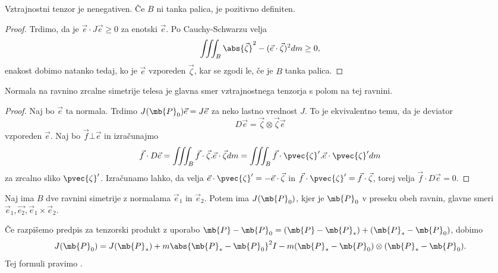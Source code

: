 \begin{trditev}
  Vztrajnostni tenzor je nenegativen.
  Če $B$ ni tanka palica, je pozitivno definiten.
\end{trditev}

\begin{proof}
  Trdimo, da je $\vec{e} \cdot J \vec{e} \ge 0$ za enotski $\vec{e}$.
  Po Cauchy-Schwarzu velja
  \[
	\iiint_B \abs{\vec{\zeta}}^2 - (\vec{e} \cdot \vec{\zeta})^2 dm \ge 0,
  \]
  enakost dobimo
  natanko tedaj, ko je $\vec{e}$ vzporeden $\vec{\zeta}$, kar se zgodi le, če je
  $B$ tanka palica.
\end{proof}


\begin{trditev}
  Normala na ravnino zrcalne simetrije telesa je glavna smer vztrajnostnega
  tenzorja s polom na tej ravnini.
\end{trditev}

\begin{proof}
  Naj bo $\vec{e}$ ta normala.
  Trdimo $J(\mb{P}_0) \vec{e} = J \vec{e}$ za neko lastno vrednost $J$.
  To je ekvivalentno temu, da je deviator
  \[
	D \vec{e} = \vec{\zeta} \otimes \vec{\zeta} \vec{e}
  \]
  vzporeden $\vec{e}$.
  Naj bo $\vec{f} \bot \vec{e}$ in izračunajmo
  \[
	\vec{f} \cdot D \vec{e}
	= \iiint_B \vec{f} \cdot \vec{\zeta} . \vec{e} \cdot \vec{\zeta} dm
	= \iiint_B \vec{f} \cdot \pvec{\zeta}' . \vec{e} \cdot \pvec{\zeta}' dm
  \]
  za zrcalno sliko $\pvec{\zeta}'$.
  Izračunamo lahko, da velja $\vec{e} \cdot \pvec{\zeta}' = - \vec{e} \cdot
  \vec{\zeta}$ in $\vec{f} \cdot \pvec{\zeta}' = \vec{f} \cdot \vec{\zeta}$,
  torej velja $\vec{f} \cdot D \vec{e} = 0$.
\end{proof}

\begin{trditev}
  Naj ima $B$ dve ravnini simetrije z normalama $\vec{e}_1$ in $\vec{e}_2$.
  Potem ima $J(\mb{P}_0)$, kjer je $\mb{P}_0$ v preseku obeh ravnin, glavne
  smeri $\vec{e}_1, \vec{e_2}, \vec{e}_1 \times \vec{e}_2$.
\end{trditev}


Če razpišemo predpis za tenzorski produkt z uporabo $\mb{P} - \mb{P}_0 = (\mb{P}
- \mb{P}_*) + (\mb{P}_* - \mb{P}_0)$, dobimo
\[
  J(\mb{P}_0) = J(\mb{P}_*) + m \abs{\mb{P}_* - \mb{P}_0}^2 I - m (\mb{P}_* -
  \mb{P}_0) \otimes (\mb{P}_* - \mb{P}_0).
\]
Tej formuli pravimo .

